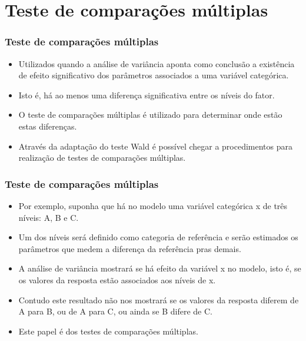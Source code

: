\documentclass[10pt,
  aspectratio=169,
  serif,
  mathserif,
  professionalfont,
  compress,
  handout,
  ]{beamer}\usepackage[]{graphicx}\usepackage[]{color}
\begin{document}
\section{Teste de comparações múltiplas}

\begin{frame}

\frametitle{Teste de comparações múltiplas}

\begin{itemize}
    \itemsep 2ex

  \item Utilizados quando a análise de variância aponta como conclusão a existência de efeito significativo dos parâmetros associados a uma variável categórica.

  \item Isto é, há ao menos uma diferença significativa entre os níveis do fator.

  \item O teste de comparações múltiplas é utilizado para determinar onde estão estas diferenças. 
  
  \item Através da adaptação do teste Wald é possível chegar a procedimentos para realização de testes de comparações múltiplas.
  
\end{itemize}

\end{frame}


\begin{frame}

\frametitle{Teste de comparações múltiplas}

\begin{itemize}
    \itemsep 2ex

  \item Por exemplo, suponha que há no modelo uma variável categórica x de três níveis: A, B e C.

  \item Um dos níveis será definido como categoria de referência e serão estimados os parâmetros que medem a diferença da referência pras demais.

  \item A análise de variância mostrará se há efeito da variável x no modelo, isto é, se os valores da resposta estão associados aos níveis de x.
  
  \item Contudo este resultado não nos mostrará se os valores da resposta diferem de A para B, ou de A para C, ou ainda se B difere de C.
  
  \item Este papel é dos testes de comparações múltiplas.
  
\end{itemize}

\end{frame}
\end{document}
